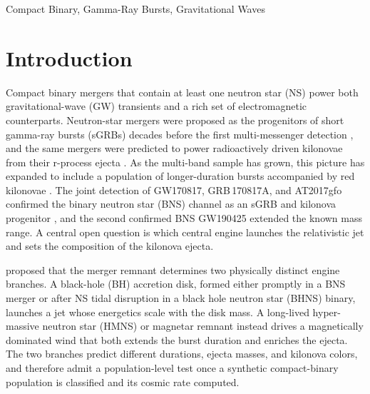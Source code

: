\documentclass[twocolumn,apj]{openjournal}
\begin{document}
\begin{keywords}
{Compact Binary, Gamma-Ray Bursts, Gravitational Waves}
\end{keywords}




\section{Introduction} \label{sec:intro}
Compact binary mergers that contain at least one neutron star (NS) power both
gravitational-wave (GW) transients and a rich set of electromagnetic
counterparts. Neutron-star mergers were proposed as the progenitors of short
gamma-ray bursts (sGRBs) decades before the first multi-messenger detection
\citep{paczynski1986,eichler1989,narayan1992}, and the same mergers were
predicted to power radioactively driven kilonovae from their r-process ejecta
\citep{lipaczynski1998,metzger2010,metzger2019}. As the multi-band sample has
grown, this picture has expanded to include a population of longer-duration
bursts accompanied by red kilonovae \citep{rastinejad2024,levan2024}. The joint
detection of GW170817, GRB\,170817A, and AT2017gfo confirmed the binary neutron
star (BNS) channel as an sGRB and kilonova progenitor
\citep{abbott2017mma,abbott2019gw170817,goldstein2017,kasen2017},
and the second confirmed BNS GW190425 \citep{abbott2020gw190425} extended the
known mass range. A central open question is which central engine launches the
relativistic jet and sets the composition of the kilonova ejecta.

\citet{gottlieb2023,gottlieb2024} proposed that the merger remnant determines two physically distinct engine branches. A black-hole (BH) accretion disk, formed either promptly in a BNS merger or after NS tidal disruption in a black hole neutron star (BHNS) binary, launches a jet
whose energetics scale with the disk mass. A long-lived hyper-massive neutron
star (HMNS) or magnetar remnant instead drives a magnetically dominated wind
that both extends the burst duration and enriches the ejecta. The two branches
predict different durations, ejecta masses, and kilonova colors, and therefore
admit a population-level test once a synthetic compact-binary population is
classified and its cosmic rate computed.




\end{document}
